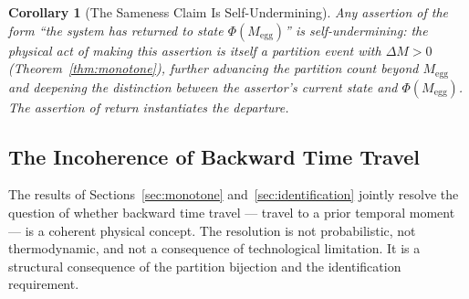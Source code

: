 \documentclass[twocolumn,10pt,a4paper]{article}
\theoremstyle{thmstyle}
\newtheorem{corollary}[theorem]{Corollary}
\theoremstyle{definition}
\theoremstyle{remark}
\newcommand{\PhiMap}{\varPhi}
\begin{document}
\begin{corollary}[The Sameness Claim Is Self-Undermining]
\label{cor:sameness}
Any assertion of the form ``the system has returned to state $\PhiMap(M_{\mathrm{egg}})$'' is self-undermining: the physical act of making this assertion is itself a partition event with $\Delta M > 0$ (Theorem~\ref{thm:monotone}), further advancing the partition count beyond $M_{\mathrm{egg}}$ and deepening the distinction between the assertor's current state and $\PhiMap(M_{\mathrm{egg}})$. The assertion of return instantiates the departure.
\end{corollary}

\subsection{The Incoherence of Backward Time Travel}
\label{sec:time-travel}

The results of Sections~\ref{sec:monotone} and~\ref{sec:identification} jointly resolve the question of whether backward time travel --- travel to a prior temporal moment --- is a coherent physical concept. The resolution is not probabilistic, not thermodynamic, and not a consequence of technological limitation. It is a structural consequence of the partition bijection and the identification requirement.
\end{document}
